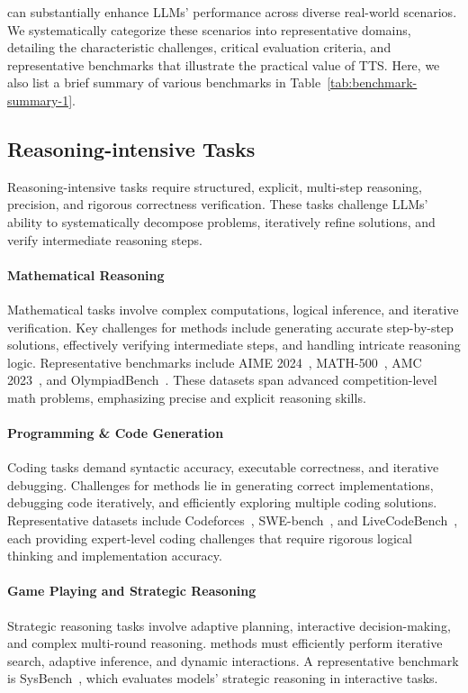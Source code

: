 \TTS can substantially enhance LLMs' performance across diverse real-world scenarios. We systematically categorize these scenarios into representative domains, detailing the characteristic challenges, critical evaluation criteria, and representative benchmarks that illustrate the practical value of TTS. Here, we also list a brief summary of various benchmarks in Table~\ref{tab:benchmark-summary-1}.

\subsection{Reasoning-intensive Tasks}
\label{sec:reasoning}

Reasoning-intensive tasks require structured, explicit, multi-step reasoning, precision, and rigorous correctness verification. These tasks challenge LLMs' ability to systematically decompose problems, iteratively refine solutions, and verify intermediate reasoning steps.

\paragraph{Mathematical Reasoning}

Mathematical tasks involve complex computations, logical inference, and iterative verification. Key challenges for \TTS methods include generating accurate step-by-step solutions, effectively verifying intermediate steps, and handling intricate reasoning logic. Representative benchmarks include AIME 2024~\citep{aime25}, MATH-500~\citep{zhang2024rest}, AMC 2023~\citep{guan2025rstarmath}, and OlympiadBench~\citep{he2024olympiadbench}. These datasets span advanced competition-level math problems, emphasizing precise and explicit reasoning skills.

\paragraph{Programming \& Code Generation}
Coding tasks demand syntactic accuracy, executable correctness, and iterative debugging. Challenges for \TTS methods lie in generating correct implementations, debugging code iteratively, and efficiently exploring multiple coding solutions. Representative datasets include Codeforces~\citep{codeforce}, SWE-bench~\citep{jimenez2024swebench}, and LiveCodeBench~\citep{jain2025livecodebench}, each providing expert-level coding challenges that require rigorous logical thinking and implementation accuracy.


\paragraph{Game Playing and Strategic Reasoning}
Strategic reasoning tasks involve adaptive planning, interactive decision-making, and complex multi-round reasoning. \TTS methods must efficiently perform iterative search, adaptive inference, and dynamic interactions. A representative benchmark is SysBench~\citep{aime25}, which evaluates models' strategic reasoning in interactive tasks.

